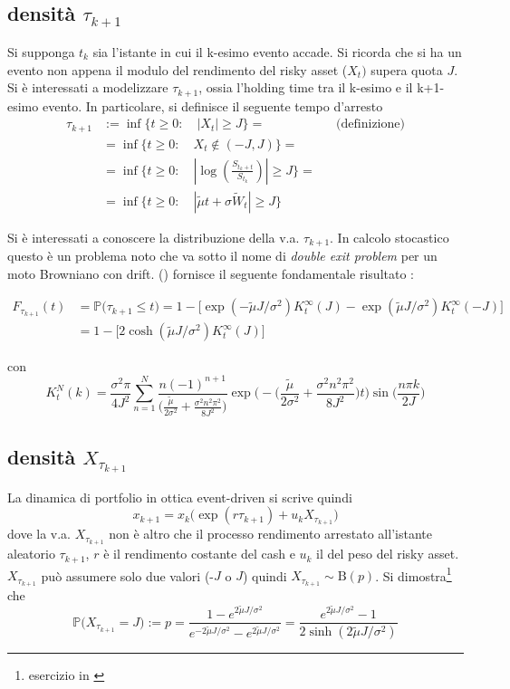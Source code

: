 \documentclass[12pt,a4paper]{article}
\theoremstyle{break}
\begin{document}
\subsection{densità $\tau_{k+1}$}
Si supponga $t_k$ sia l'istante in cui il k-esimo evento accade. Si ricorda che si ha un evento non appena il modulo del rendimento del risky asset ($X_t)$  supera quota $J$. Si è interessati a modelizzare  $\tau_{k+1}$, ossia l'holding time tra il k-esimo e il k+1-esimo evento. In particolare, si definisce il seguente tempo d'arresto
\begin{align*}
\tau_{k+1} & := \inf\{t\geq 0 : \quad |X_t| \geq J \} = && \text{(definizione)}\\
& = \inf\{t\geq 0 : \quad X_t \notin (-J,J) \} = \\
& = \inf\{t\geq 0 : \quad |\log(\frac{S_{t_k + t}}{S_{t_k}})| \geq J \} =\\
& = \inf\{t\geq 0 : \quad |\tilde{\mu} t + \sigma \widetilde{W}_t| \geq J \}
\end{align*}


Si è interessati a conoscere la distribuzione della v.a. $\tau_{k+1}$. In calcolo stocastico questo è un problema noto che va sotto il nome di  \textit{double exit problem} per un moto Browniano con drift. (\cite{PassTime}) fornisce il seguente fondamentale risultato :

\begin{align*}
F_{\tau_{k+1}}(t) & = \mathbb{P}\Big(\tau_{k+1}\leq t \Big) = 1 - \big[ \exp(-\tilde{\mu}J / \sigma^2) K_t^\infty(J) - \exp(\tilde{\mu}J / \sigma^2) K_t^\infty(-J)\big] \\
& = 1-\big[2\cosh(\tilde{\mu}J / \sigma^2)K_t^\infty(J)\big]
\end{align*}

con
\[
K_t^N(k) = \frac{\sigma^2\pi}{4J^2}\sum_{n=1}^{N}\frac{n(-1)^{n+1}}{\big(\frac{\tilde{\mu}}{2\sigma^2} + \frac{\sigma^2n^2\pi^2}{8J^2}\big)}\exp\Big(-\big(\frac{\tilde{\mu}}{2\sigma^2} + \frac{\sigma^2n^2\pi^2}{8J^2}\big)t\Big) \sin\big(\frac{n\pi k}{2J}\big)
\]

\subsection{densità $X_{\tau_{k+1}}$}
La dinamica di portfolio in ottica event-driven si scrive quindi
\begin{equation}\label{ptfDyn}
\boxed{x_{k+1} = x_k \big(\exp(r \tau_{k+1}) + u_k X_{\tau_{k+1}}\big)}
\end{equation}
dove la v.a. $X_{\tau_{k+1}}$ non è altro che il processo rendimento arrestato all'istante aleatorio $\tau_{k+1}$, $r$ è il rendimento costante del cash e $u_k$ il del peso del risky asset.
$X_{\tau_{k+1}}$ può assumere solo due valori (-$J$ o $J$) quindi $X_{\tau_{k+1}} \sim \text{B}(p)$. Si dimostra\footnote{esercizio in \cite{Baldi}} che
\begin{equation}
\mathbb{P}\Big(X_{\tau_{k+1}} = J\Big) := p = \frac{1-e^{2\tilde{\mu}J/\sigma^2}}{e^{-2\tilde{\mu}J/\sigma^2} - e^{2\tilde{\mu}J/\sigma^2}} = \frac{e^{2\tilde{\mu}J/\sigma^2}-1}{2\sinh(2\tilde{\mu}J/\sigma^2)}
\end{equation}
\end{document}
